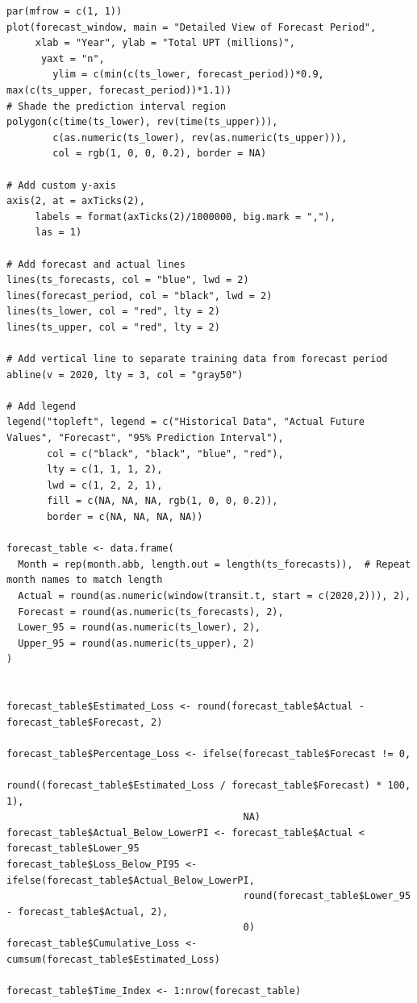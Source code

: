 \documentclass[11pt]{article}
\begin{document}
{\begin{verbatim}
par(mfrow = c(1, 1))
plot(forecast_window, main = "Detailed View of Forecast Period",
     xlab = "Year", ylab = "Total UPT (millions)",
      yaxt = "n",
        ylim = c(min(c(ts_lower, forecast_period))*0.9, max(c(ts_upper, forecast_period))*1.1))
# Shade the prediction interval region
polygon(c(time(ts_lower), rev(time(ts_upper))),
        c(as.numeric(ts_lower), rev(as.numeric(ts_upper))),
        col = rgb(1, 0, 0, 0.2), border = NA)

# Add custom y-axis
axis(2, at = axTicks(2),
     labels = format(axTicks(2)/1000000, big.mark = ","),
     las = 1)

# Add forecast and actual lines
lines(ts_forecasts, col = "blue", lwd = 2)
lines(forecast_period, col = "black", lwd = 2)
lines(ts_lower, col = "red", lty = 2)
lines(ts_upper, col = "red", lty = 2)

# Add vertical line to separate training data from forecast period
abline(v = 2020, lty = 3, col = "gray50")

# Add legend
legend("topleft", legend = c("Historical Data", "Actual Future Values", "Forecast", "95% Prediction Interval"),
       col = c("black", "black", "blue", "red"),
       lty = c(1, 1, 1, 2),
       lwd = c(1, 2, 2, 1),
       fill = c(NA, NA, NA, rgb(1, 0, 0, 0.2)),
       border = c(NA, NA, NA, NA))

forecast_table <- data.frame(
  Month = rep(month.abb, length.out = length(ts_forecasts)),  # Repeat month names to match length
  Actual = round(as.numeric(window(transit.t, start = c(2020,2))), 2),
  Forecast = round(as.numeric(ts_forecasts), 2),
  Lower_95 = round(as.numeric(ts_lower), 2),
  Upper_95 = round(as.numeric(ts_upper), 2)
)


forecast_table$Estimated_Loss <- round(forecast_table$Actual - forecast_table$Forecast, 2)

forecast_table$Percentage_Loss <- ifelse(forecast_table$Forecast != 0,
                                         round((forecast_table$Estimated_Loss / forecast_table$Forecast) * 100, 1),
                                         NA)
forecast_table$Actual_Below_LowerPI <- forecast_table$Actual < forecast_table$Lower_95
forecast_table$Loss_Below_PI95 <- ifelse(forecast_table$Actual_Below_LowerPI,
                                         round(forecast_table$Lower_95 - forecast_table$Actual, 2),
                                         0)
forecast_table$Cumulative_Loss <- cumsum(forecast_table$Estimated_Loss)

forecast_table$Time_Index <- 1:nrow(forecast_table)



\end{verbatim}}
\end{document}

